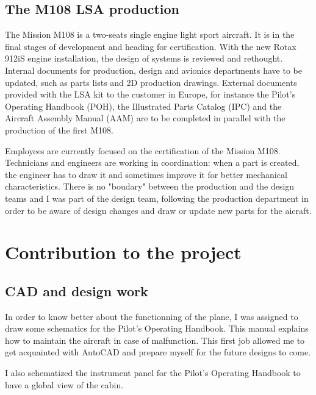\documentclass[11pt,a4paper]{report}
\begin{document}
\subsection{The M108 LSA production}
The Mission M108 is a two-seats single engine light sport aircraft. It is in the final stages of development and heading for certification. With the new Rotax 912iS engine installation, the design of systems is reviewed and rethought. Internal documents for production, design and avionics departments have to be updated, such as parts lists and 2D production drawings. External documents provided with the LSA kit to the customer in Europe, for instance the Pilot's Operating Handbook (POH), the Illustrated Parts Catalog (IPC) and the Aircraft Assembly Manual (AAM) are to be completed in parallel with the production of the first M108.

\bigskip

Employees are currently focused on the certification of the Mission M108. Technicians and engineers are working in coordination: when a part is created, the engineer has to draw it and sometimes improve it for better mechanical characteristics. There is no "boudary" between the production and the design teams and I was part of the design team, following the production department in order to be aware of design changes and draw or update new parts for the aicraft.

\newpage

\section{Contribution to the project}
\subsection{CAD and design work}

In order to know better about the functionning of the plane, I was assigned to draw some schematics for the Pilot's Operating Handbook. This manual explains how to maintain the aircraft in case of malfunction. This first job allowed me to get acquainted with AutoCAD and prepare myself for the future designs to come. 


\bigskip

I also schematized the instrument panel for the Pilot's Operating Handbook to have a global view of the cabin.
\end{document}
